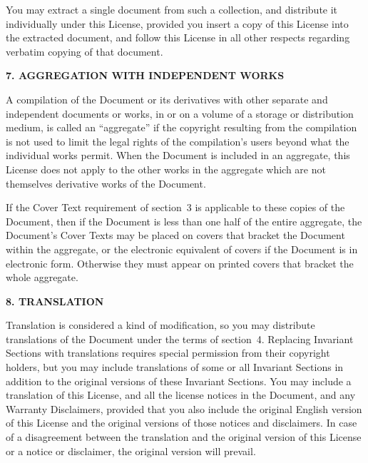 \documentclass[a4paper,11pt,oneside]{book}
\begin{document}
You may extract a single document from such a collection, and distribute
it individually under this License, provided you insert a copy of this
License into the extracted document, and follow this License in all
other respects regarding verbatim copying of that document.


\begin{center}
	{\Large\bf 7. AGGREGATION WITH INDEPENDENT WORKS\par}
\end{center}


A compilation of the Document or its derivatives with other separate
and independent documents or works, in or on a volume of a storage or
distribution medium, is called an ``aggregate'' if the copyright
resulting from the compilation is not used to limit the legal rights
of the compilation's users beyond what the individual works permit.
When the Document is included in an aggregate, this License does not
apply to the other works in the aggregate which are not themselves
derivative works of the Document.

If the Cover Text requirement of section~3 is applicable to these
copies of the Document, then if the Document is less than one half of
the entire aggregate, the Document's Cover Texts may be placed on
covers that bracket the Document within the aggregate, or the
electronic equivalent of covers if the Document is in electronic form.
Otherwise they must appear on printed covers that bracket the whole
aggregate.


\begin{center}
	{\Large\bf 8. TRANSLATION\par}
\end{center}


Translation is considered a kind of modification, so you may
distribute translations of the Document under the terms of section~4.
Replacing Invariant Sections with translations requires special
permission from their copyright holders, but you may include
translations of some or all Invariant Sections in addition to the
original versions of these Invariant Sections.  You may include a
translation of this License, and all the license notices in the
Document, and any Warranty Disclaimers, provided that you also include
the original English version of this License and the original versions
of those notices and disclaimers.  In case of a disagreement between
the translation and the original version of this License or a notice
or disclaimer, the original version will prevail.
\end{document}
